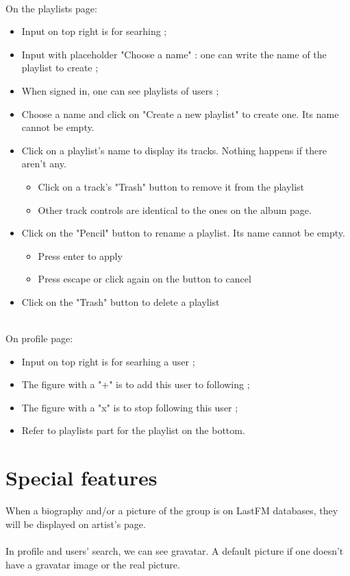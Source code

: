 \documentclass[11pt]{article}
\begin{document}
        \noindent \\
        On the playlists page:
        \begin{itemize}
     	\item Input on top right is for searhing ;
        \item Input with placeholder "Choose a name" : one can write the name of the playlist to create ;
   		\item When signed in, one can see playlists of users ;
        \item Choose a name and click on "Create a new playlist" to create one. Its name cannot be empty.
        \item Click on a playlist's name to display its tracks. Nothing happens if there aren't any.
            \begin{itemize}
            \item Click on a track's "Trash" button to remove it from the playlist
            \item Other track controls are identical to the ones on the album page.
            \end{itemize}
        \item Click on the "Pencil" button to rename a playlist. Its name cannot be empty.
            \begin{itemize}
            \item Press enter to apply
            \item Press escape or click again on the button to cancel
            \end{itemize}
        \item Click on the "Trash" button to delete a playlist
        \end{itemize}
	    \noindent \\
		On profile page:
	    \begin{itemize}
    	\item Input on top right is for searhing a user ;
    	\item The figure with a "+" is to add this user to following ;
    	\item The figure with a "x" is to stop following this user ;
    	\item Refer to playlists part for the playlist on the bottom.
        \end{itemize}
    	

	\section{Special features}
	\noindent
	When a biography and/or a picture of the group is on LastFM databases, they will be displayed on artist's page.
	\\
	\\
	In profile and users' search, we can see gravatar. A default picture if one doesn't have a gravatar image or the real picture.
\end{document}

